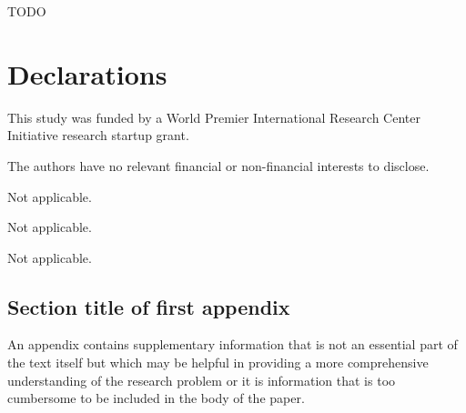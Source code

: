 \documentclass[pdflatex,iicol,sn-basic]{sn-jnl}
\theoremstyle{thmstyleone}%
\theoremstyle{thmstyletwo}%
\theoremstyle{thmstylethree}%
\begin{document}
TODO

\section*{Declarations}

This study was funded by a World Premier International Research Center Initiative research startup grant.

The authors have no relevant financial or non-financial interests to disclose.

Not applicable.

Not applicable.

Not applicable.

\begin{appendices}

\section{Section title of first appendix}\label{secA1}

An appendix contains supplementary information that is not an essential part of the text itself but which may be helpful in providing a more comprehensive understanding of the research problem or it is information that is too cumbersome to be included in the body of the paper.




\end{appendices}



\end{document}
